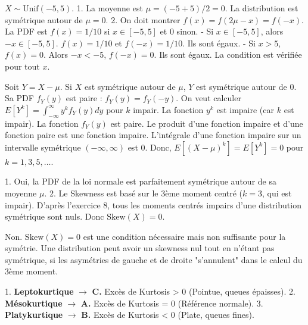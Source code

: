 
\begin{correctionbox}
$X \sim \text{Unif}(-5, 5)$.
1.  La moyenne est $\mu = (-5+5)/2 = 0$. La distribution est symétrique autour de $\mu=0$.
2.  On doit montrer $f(x) = f(2\mu - x) = f(-x)$.
    La PDF est $f(x) = 1/10$ si $x \in [-5, 5]$ et $0$ sinon.
    - Si $x \in [-5, 5]$, alors $-x \in [-5, 5]$. $f(x) = 1/10$ et $f(-x) = 1/10$. Ils sont égaux.
    - Si $x > 5$, $f(x) = 0$. Alors $-x < -5$, $f(-x) = 0$. Ils sont égaux.
    La condition est vérifiée pour tout $x$.
\end{correctionbox}

\begin{correctionbox}
Soit $Y = X-\mu$. Si $X$ est symétrique autour de $\mu$, $Y$ est symétrique autour de 0. Sa PDF $f_Y(y)$ est paire : $f_Y(y) = f_Y(-y)$.
On veut calculer $E[Y^k] = \int_{-\infty}^{\infty} y^k f_Y(y) dy$ pour $k$ impair.
La fonction $y^k$ est impaire (car $k$ est impair).
La fonction $f_Y(y)$ est paire.
Le produit d'une fonction impaire et d'une fonction paire est une fonction impaire.
L'intégrale d'une fonction impaire sur un intervalle symétrique $(-\infty, \infty)$ est 0.
Donc, $E[(X-\mu)^k] = E[Y^k] = 0$ pour $k=1, 3, 5, \dots$.
\end{correctionbox}

\begin{correctionbox}
1.  Oui, la PDF de la loi normale est parfaitement symétrique autour de sa moyenne $\mu$.
2.  Le Skewness est basé sur le 3ème moment centré ($k=3$, qui est impair). D'après l'exercice 8, tous les moments centrés impairs d'une distribution symétrique sont nuls.
    Donc $\text{Skew}(X) = 0$.
\end{correctionbox}

\begin{correctionbox}
Non. $\text{Skew}(X)=0$ est une condition nécessaire mais non suffisante pour la symétrie. Une distribution peut avoir un skewness nul tout en n'étant pas symétrique, si les asymétries de gauche et de droite "s'annulent" dans le calcul du 3ème moment.
\end{correctionbox}


\begin{correctionbox}
1.  \textbf{Leptokurtique} $\rightarrow$ \textbf{C.} Excès de Kurtosis > 0 (Pointue, queues épaisses).
2.  \textbf{Mésokurtique} $\rightarrow$ \textbf{A.} Excès de Kurtosis = 0 (Référence normale).
3.  \textbf{Platykurtique} $\rightarrow$ \textbf{B.} Excès de Kurtosis < 0 (Plate, queues fines).
\end{correctionbox}

